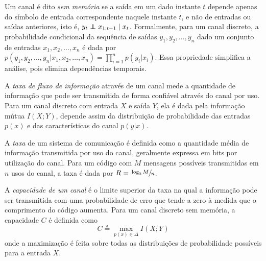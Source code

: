 \begin{definition}
  Um canal é dito \emph{sem memória} se a saída em um dado instante $t$ depende apenas do
símbolo de entrada correspondente naquele instante $t$, e não de entradas ou saídas
anteriores, isto é, $y_t \independent x_{1:t-1} \mid x_t$.
Formalmente, para um canal discreto, a probabilidade condicional da
sequência de saídas $y_1, y_2, \dots, y_n$ dado um conjunto de entradas 
$x_1, x_2, \dots, x_n$ é dada por 
$p(y_1, y_2, \dots, y_n | x_1, x_2, \dots, x_n) = \prod_{i=1}^n p(y_i | x_i)$. 
Essa propriedade simplifica a análise, pois
elimina dependências temporais.
\end{definition}

\begin{definition}
A \emph{taxa de fluxo de informação} através de um canal mede a quantidade de
informação que pode ser transmitida de forma confiável através do canal por
uso. Para um canal discreto com entrada $X$ e saída $Y$, ela é dada pela
informação mútua $I(X;Y)$, depende assim da distribuição de probabilidade das
entradas $p(x)$ e das características do canal $p(y|x)$.
\end{definition}

\begin{definition}[Taxa]
  A \emph{taxa} de um sistema de comunicação é definida como a quantidade média de
informação transmitida por uso do canal, geralmente expressa em bits por
utilização do canal. Para um código com $M$ mensagens possíveis transmitidas em
$n$ usos do canal, a taxa é dada por $R = \sfrac{\log_2 M}{n}$.
\end{definition}

\begin{definition}
  A \emph{capacidade de um canal} é o limite superior da taxa na qual a informação pode
ser transmitida com uma probabilidade de erro que tende a zero à medida que o
comprimento do código aumenta. Para um canal discreto sem
memória, a capacidade $C$ é definida como
\begin{equation}
  C \triangleq \max_{p(x) \in \Delta} I(X;Y)
\end{equation}
onde a
maximização é feita sobre todas as distribuições de probabilidade possíveis
para a entrada $X$.
\end{definition}






